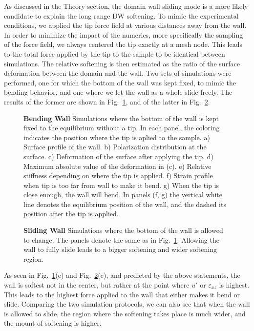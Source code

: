 As discussed in the Theory section, the domain wall sliding mode is a more likely candidate to explain the long range DW softening.
To mimic the experimental conditions, we applied the tip force field at various distances away from the wall.
In order to minimize the impact of the numerics, more specifically the sampling of the force field, we always centered the tip exactly at a mesh node.
This leads to the total force applied by the tip to the sample to be identical between simulations.
The relative softening is then estimated as the ratio of the surface deformation between the domain and the wall.
Two sets of simulations were performed, one for which the bottom of the wall was kept fixed, to mimic the bending behavior, and one where we let the wall as a whole slide freely.
The results of the former are shown in Fig.~\ref{fig:BTO_bending_sim}, and of the latter in Fig.~\ref{fig:BTO_sliding_sim}.
\begin{figure}[h!]
	\caption{\label{fig:BTO_bending_sim}{\bf Bending Wall} Simulations where the bottom of the wall is kept fixed to the equilibrium without a tip. In each panel, the coloring indicates the position where the tip is aplied to the sample. a) Surface profile of the wall. b) Polarization distribution at the surface. c) Deformation of the surface after applying the tip. d) Maximum absolute value of the deformation in (c). e) Relative stiffness depending on where the tip is applied. f) Strain profile when tip is too far from wall to make it bend. g) When the tip is close enough, the wall will bend. In panels (f, g) the vertical white line denotes the equilibrium position of the wall, and the dashed its position after the tip is applied.}
\end{figure}
\begin{figure}[h!]
	\caption{\label{fig:BTO_sliding_sim}{\bf Sliding Wall} Simulations where the bottom of the wall is allowed to change. The panels denote the same as in Fig.~\ref{fig:BTO_bending_sim}. Allowing the wall to fully slide leads to a bigger softening and wider softening region.}
\end{figure}
As seen in Fig.~\ref{fig:BTO_bending_sim}(e) and Fig.~\ref{fig:BTO_sliding_sim}(e), and predicted by the above statements, the wall is softest not in the center, but rather at the point where $u'$ or $\varepsilon_{xz}$ is highest.
This leads to the highest force applied to the wall that either makes it bend or slide.
Comparing the two simulation protocols, we can also see that when the wall is allowed to slide, the region where the softening takes place is much wider, and the mount of softening is higher.
